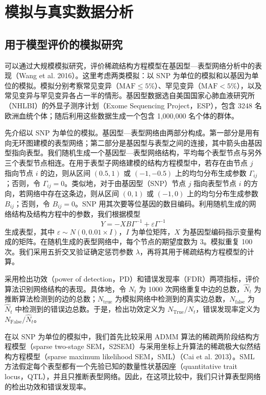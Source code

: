 \FloatBarrier
\section{模拟与真实数据分析}
\label{sec:omics-simulation-real-data}

\subsection{用于模型评价的模拟研究}

可以通过大规模模拟研究，评价稀疏结构方程模型在基因型—表型网络分析中的表现（Wang et al. 2016）。这里考虑两类模拟：以 SNP 为单位的模拟和以基因为单位的模拟。模拟分别考察常见变异（$\mathrm{MAF}\leq 5\%$）、罕见变异（$\mathrm{MAF}<5\%$），以及常见变异与罕见变异各占一半的情形。基因型数据选自美国国家心肺血液研究所（NHLBI）的外显子测序计划（Exome Sequencing Project，ESP），包含 3248 名欧洲血统个体；随后利用这些数据生成一个包含 1,000,000 名个体的群体。

先介绍以 SNP 为单位的模拟。基因型—表型网络由两部分构成。第一部分是用有向无环图建模的表型网络；第二部分是基因型与表型之间的连接，其中箭头由基因型指向表型。我们随机生成一个基因型—表型网络结构，平均每个表型节点与另外三个表型节点相连。在用于表型子网络建模的结构方程模型中，若存在由节点 $j$ 指向节点 $i$ 的边，则从区间 $(0.5,1)$ 或 $(-1,-0.5)$ 上的均匀分布生成参数 $\Gamma_{ij}$；否则，令 $\Gamma_{ij}=0$。类似地，对于由基因型（SNP）节点 $j$ 指向表型节点 $i$ 的方向，若网络中存在这条边，则从区间 $(0,1)$ 或 $(-1,0)$ 上的均匀分布生成参数 $B_{ij}$；否则，令 $B_{ij}=0$。SNP 用其次要等位基因的数目编码。利用随机生成的网络结构及结构方程中的参数，我们根据模型
\[
Y=-XB\Gamma^{-1}+\varepsilon\Gamma^{-1}
\]
生成表型，其中 $\varepsilon\sim N(0,0.01\times I)$，$I$ 为单位矩阵，$X$ 为基因型编码指示变量构成的矩阵。在随机生成的表型网络中，每个节点的期望度数为 3。模拟重复 100 次。我们采用五折交叉验证确定惩罚参数 $\lambda$，再将其用于稀疏结构方程模型的计算。

采用检出功效（power of detection，PD）和错误发现率（FDR）两项指标，评价算法识别网络结构的表现。具体地，令 $N_t$ 为 1000 次网络重复中边的总数，$\widehat N_t$ 为推断算法检测到的边的总数；$N_{\mathrm{true}}$ 为模拟网络中检测到的真实边总数，$N_{\mathrm{false}}$ 为 $\widehat N_t$ 中检测到的错误边总数。于是，检出功效定义为 $N_{\mathrm{True}}/N_t$，错误发现率定义为 $N_{\mathrm{False}}/\widehat N_t$。

在以 SNP 为单位的模拟中，我们首先比较采用 ADMM 算法的稀疏两阶段结构方程模型（sparse two-stage SEM，S2SEM）与采用坐标上升算法的稀疏极大似然结构方程模型（sparse maximum likelihood SEM，SML）（Cai et al. 2013）。SML 方法假定每个表型都有一个先验已知的数量性状基因座（quantitative trait locus，QTL），并且只推断表型网络。因此，在这项比较中，我们只计算表型网络的检出功效和错误发现率。

